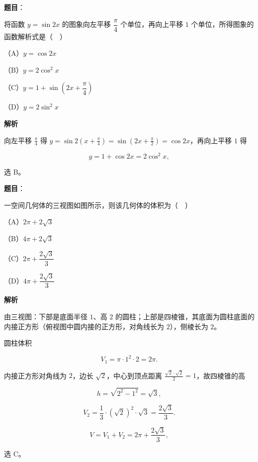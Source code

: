 \begin{answer}

\textbf{题目}：

将函数 $y=\sin2x$ 的图象向左平移 $\dfrac{\pi}{4}$ 个单位，再向上平移 $1$ 个单位，所得图象的函数解析式是（　）

（A）$y=\cos2x$

（B）$y=2\cos^2x$

（C）$y=1+\sin\left(2x+\dfrac{\pi}{4}\right)$

（D）$y=2\sin^2x$

\textbf{解析}

向左平移 $\frac\pi4$ 得 $y=\sin2\left(x+\frac\pi4\right)=\sin\left(2x+\frac\pi2\right)=\cos2x$，再向上平移 $1$ 得

\nopagebreak[4]
\[y=1+\cos2x=2\cos^2x,\]

选 B。


\end{answer}
\begin{answer}

\textbf{题目}：

一空间几何体的三视图如图所示，则该几何体的体积为（　）

（A）$2\pi+2\sqrt3$

（B）$4\pi+2\sqrt3$

（C）$2\pi+\dfrac{2\sqrt3}{3}$

（D）$4\pi+\dfrac{2\sqrt3}{3}$
\nopagebreak[4]
\begin{center}\end{center}
\nopagebreak[4]
\textbf{解析}

由三视图：下部是底面半径 $1$、高 $2$ 的圆柱；上部是四棱锥，其底面为圆柱底面的内接正方形（俯视图中圆内接的正方形，对角线长为 $2$），侧棱长为 $2$。

圆柱体积

\nopagebreak[4]
\[V_1=\pi\cdot1^2\cdot2=2\pi .\]

内接正方形对角线为 $2$，边长 $\sqrt2$，中心到顶点距离 $\frac{\sqrt2\cdot\sqrt2}{2}=1$，故四棱锥的高

\nopagebreak[4]
\[h=\sqrt{2^2-1^2}=\sqrt3,\]

\nopagebreak[4]
\[V_2=\frac13\cdot(\sqrt2)^2\cdot\sqrt3=\frac{2\sqrt3}{3}.\]

\nopagebreak[4]
\[V=V_1+V_2=2\pi+\frac{2\sqrt3}{3},\]

选 C。


\end{answer}
